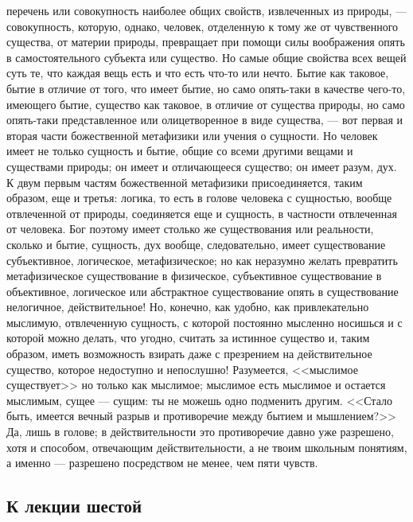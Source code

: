 \documentclass[12pt]{article}
\begin{document}
перечень или совокупность наиболее общих свойств, извлеченных из природы, --- совокупность, которую, однако, человек, отделенную к тому же от чувственного существа, от материи природы, превращает при помощи силы воображения опять в самостоятельного субъекта или существо. Но самые общие свойства всех вещей суть те, что каждая вещь есть и что есть что-то или нечто. Бытие как таковое, бытие в отличие от того, что имеет бытие, но само опять-таки в качестве чего-то, имеющего бытие, существо как таковое, в отличие от существа природы, но само опять-таки представленное или олицетворенное в виде существа, --- вот первая и вторая части божественной метафизики или учения о сущности. Но человек имеет не только сущность и бытие, общие со всеми другими вещами и существами природы; он имеет и отличающееся существо; он имеет разум, дух. К двум первым частям божественной метафизики присоединяется, таким образом, еще и третья: логика, то есть в голове человека с сущностью, вообще отвлеченной от природы, соединяется еще и сущность, в частности отвлеченная от человека. Бог поэтому имеет столько же существования или реальности, сколько и бытие, сущность, дух вообще, следовательно, имеет существование субъективное, логическое, метафизическое; но как неразумно желать превратить метафизическое существование в физическое, субъективное существование в объективное, логическое или абстрактное существование опять в существование нелогичное, действительное! Но, конечно, как удобно, как привлекательно мыслимую, отвлеченную сущность, с которой постоянно мысленно носишься и с которой можно делать, что угодно, считать за истинное существо и, таким образом, иметь возможность взирать даже с презрением на действительное существо, которое недоступно и непослушно! Разумеется, <<мыслимое существует>>  но только как мыслимое; мыслимое есть мыслимое и остается мыслимым, сущее --- сущим: ты не можешь одно подменить другим. <<Стало быть, имеется вечный разрыв и противоречие между бытием и мышлением?>> Да, лишь в голове; в действительности это противоречие давно уже разрешено, хотя и способом, отвечающим действительности, а не твоим школьным понятиям, а именно --- разрешено посредством не менее, чем пяти чувств. 

\subsection*{К лекции шестой}
\end{document}
